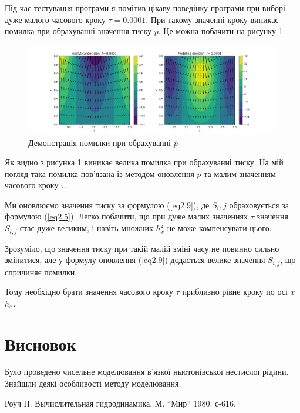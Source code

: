\documentclass[a4paper,12pt]{article}
\begin{document}
Під час тестування програми я помітив цікаву поведінку програми при виборі дуже малого часового кроку $\tau = 0.0001$. При такому значенні кроку виникає помилка при обрахуванні значення тиску $p$. Це можна побачити на рисунку \ref{ris:3}.

\begin{figure}[h]
	\center \includegraphics[scale=0.5]{Figure_3.png}
	\caption{Демонстрація помилки при обрахуванні $p$} \label{ris:3}
\end{figure}

Як видно з рисунка \ref{ris:3} виникає велика помилка при обрахуванні тиску. На мій погляд така помилка пов'язана із методом оновлення $p$ та малим значенням часового кроку $\tau$. 

Ми оновлюємо значення тиску за формулою (\ref{eq2.9}), де $S_i,j$ обраховується за формулою (\ref{eq2.5}). Легко побачити, що при дуже малих значеннях $\tau$ значення $S_{i,j}$ стає дуже великим, і навіть множник $h_x^2$ не може компенсувати цього.

Зрозуміло, що значення тиску при такій малій зміні часу не повинно сильно змінитися, але у формулу оновлення (\ref{eq2.9}) додається велике значення $S_{i,j}$, що спричиняє помилки.

Тому необхідно брати значення часового кроку $\tau$ приблизно рівне кроку по осі $x$ $h_x$.

\section{Висновок}

Було проведено чисельне моделювання в’язкої ньютонівської нестислої рідини. Знайшли деякі особливості методу моделювання.


\begin{thebibliography}{}
	 Роуч П. Вычислительная гидродинамика. М. “Мир” 1980. с-616.
\end{thebibliography}
\end{document}
